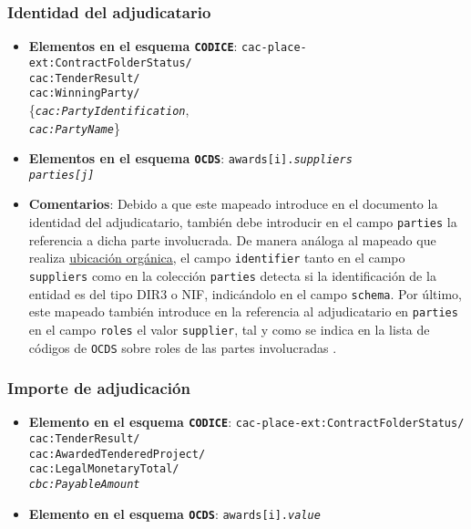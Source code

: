         \subsubsection{Identidad del adjudicatario}
            \begin{itemize}
                \item \textbf{Elementos en el esquema \texttt{CODICE}}:
                    \tabto{7.6cm} \texttt{cac-place-ext:ContractFolderStatus/} \\
                    \tabto{7.6cm} \texttt{cac:TenderResult/} \\
                    \tabto{7.6cm} \texttt{cac:WinningParty/} \\
                    \tabto{7.7cm} \{\texttt{\textit{cac:PartyIdentification}}, \\
                    \tabto{7.7cm} \texttt{\textit{cac:PartyName}}\}
                \item \textbf{Elementos en el esquema \texttt{OCDS}}:
                    \tabto{7.6cm} \texttt{awards[i].\textit{suppliers}} \\
                    \tabto{7.6cm} \texttt{\textit{parties[j]}}
                \item \textbf{Comentarios}: Debido a que este mapeado introduce en el documento la identidad del adjudicatario, también debe introducir en el campo \texttt{parties} la referencia a dicha parte involucrada. De manera análoga al mapeado que realiza  \hyperref[subsec:UbicacionOrganica]{ubicación orgánica}, el campo \texttt{identifier} tanto en el campo \texttt{suppliers} como en la colección \texttt{parties} detecta si la identificación de la entidad es del tipo DIR3 o NIF, indicándolo en el campo \texttt{schema}. Por último, este mapeado también introduce en la referencia al adjudicatario en \texttt{parties} en el campo \texttt{roles} el valor \texttt{supplier}, tal y como se indica en la lista de códigos de \texttt{OCDS} sobre roles de las partes involucradas \cite{CR18}.
            \end{itemize}
            
        \subsubsection{Importe de adjudicación}
            \begin{itemize}
                \item \textbf{Elemento en el esquema \texttt{CODICE}}:
                    \tabto{7.6cm} \texttt{cac-place-ext:ContractFolderStatus/} \\
                    \tabto{7.6cm} \texttt{cac:TenderResult/} \\
                    \tabto{7.6cm} \texttt{cac:AwardedTenderedProject/} \\
                    \tabto{7.6cm} \texttt{cac:LegalMonetaryTotal/} \\
                    \tabto{7.6cm} \texttt{\textit{cbc:PayableAmount}}
                \item \textbf{Elemento en el esquema \texttt{OCDS}}:
                    \tabto{7.6cm} \texttt{awards[i].\textit{value}}
            \end{itemize}
            
